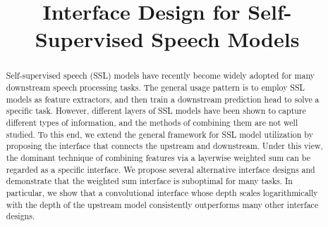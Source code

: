 \documentclass{Interspeech2024}
\title{Interface Design for Self-Supervised Speech Models}
\begin{document}
\maketitle

\begin{abstract}
    Self-supervised speech (SSL) models have recently become widely adopted for many  downstream speech processing tasks. The general usage pattern is to employ SSL models as feature extractors, and then train a downstream prediction head to solve a specific task. However, different layers of SSL models have been shown to capture different types of information, and the methods of combining them are not well studied. To this end, we extend the general framework for SSL model utilization by proposing the interface that connects the upstream and downstream. Under this view, the dominant technique of combining features via a layerwise weighted sum can be regarded as a specific interface. We propose several alternative interface designs and demonstrate that the weighted sum interface is suboptimal for many tasks. In particular, we show that a convolutional interface whose depth scales logarithmically with the depth of the upstream model consistently outperforms many other interface designs.
\end{abstract}
\end{document}
